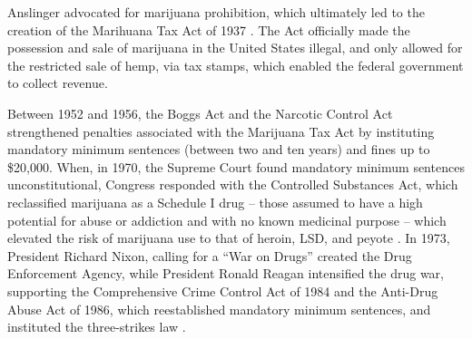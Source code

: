 
Anslinger advocated for marijuana prohibition, which ultimately led to the creation of the Marihuana Tax Act of 1937 \citep{newhart_and_dolphin_2018}. The Act officially made the possession and sale of marijuana in the United States illegal, and only allowed for the restricted sale of hemp, via tax stamps, which enabled the federal government to collect revenue. 

Between 1952 and 1956, the Boggs Act and the Narcotic Control Act strengthened penalties associated with the Marijuana Tax Act by instituting mandatory minimum sentences (between two and ten years) and fines up to \$20,000. When, in 1970, the Supreme Court found mandatory minimum sentences unconstitutional, Congress responded with the Controlled Substances Act, which reclassified marijuana as a Schedule I drug -- those assumed to have a high potential for abuse or addiction and with no known medicinal purpose -- which elevated the risk of marijuana use to that of heroin, LSD, and peyote \citep{newhart_and_dolphin_2018}. In 1973, President Richard Nixon, calling for a ``War on Drugs'' created the Drug Enforcement Agency, while President Ronald Reagan intensified the drug war, supporting the Comprehensive Crime Control Act of 1984 and the Anti-Drug Abuse Act of 1986, which reestablished mandatory minimum sentences, and instituted the three-strikes law \citep{alexander_2010}.

